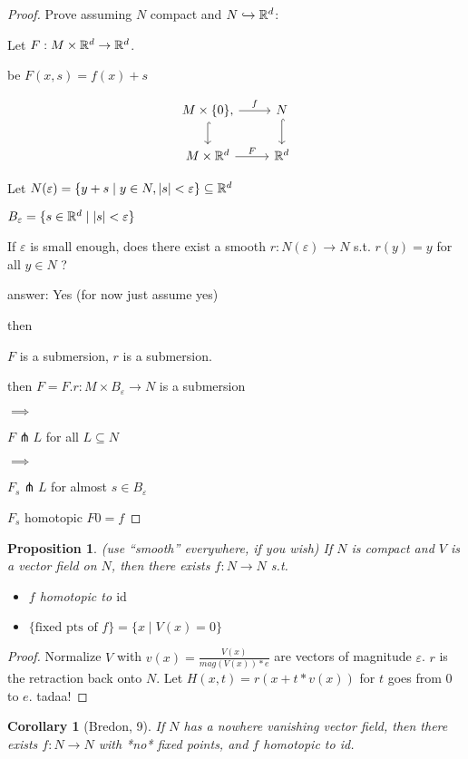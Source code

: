 \documentclass[11pt]{amsbook}
\newenvironment{dateenv}{
	\vspace{1em}
}{
	\vspace{1em}
}
\newcommand{\mydate}[4]{
	\newdate{#1}{#2}{#3}{#4}
	\begin{dateenv}
		\hfill\displaydate{#1}
	\end{dateenv}
}
\theoremstyle{mystyle} \newtheorem{thrm}[thm]{Theorem}
\theoremstyle{mystyle} \newtheorem{defi}[thm]{Definition}
\theoremstyle{mystyle} \newtheorem{coro}[thm]{Corollary}
\theoremstyle{mystyle} \newtheorem{propo}[thm]{Proposition}
\theoremstyle{mystyle} \newtheorem{lemm}[thm]{Lemma}
\numberwithin{thm}{section}
\newcommand{\id}{\text{id}}
\renewcommand{\epsilon}{\varepsilon}
\newcommand{\transverse}{\pitchfork}
\newcommand{\x}{\times}
\begin{document}
\begin{proof}
	Prove assuming $N$ compact and $N \hookrightarrow {\mathbb R}^d$:

	Let $\overset{~}{F}: M \x \R^d \to \R^d$.

	be $\overset{~}{F}(x,s) = f(x) + s$

	$$\begin{tikzcd}
		M \x \{0\} \arrow[r, "f"], \arrow[d, hook] & N \arrow[d, hook] \\
		M \x \R^d \arrow[r, "\overset{~}{F}"] & \R^d
	\end{tikzcd}$$

	Let $N(\epsilon) = \{ y+s \mid y \in N, |s| < \epsilon \} \subseteq \R^d$

	$B_{\epsilon} = \{ s \in \R^d \mid |s| < \epsilon \}$

	If $\epsilon$ is small enough, does there exist a smooth $r : N(\epsilon) \to N$ s.t. $r(y) = y$ for all $y \in N$ ?

	answer: Yes (for now just assume yes)

	then

	$\overset{~}{F}$ is a submersion, $r$ is a submersion.

	then $F = \overset{~}{F}.r : M \x B_\epsilon \to N$ is a submersion

	$\implies$

	$F \transverse L$ for all $L \subseteq N$

	$\implies$

	$F_s \transverse L$ for almost $s \in B_\epsilon$

	$F_s$ homotopic $F0 = f$

\end{proof}
\mydate{d10}{7}{11}{2016}
\begin{propo}
	(use ``smooth'' everywhere, if you wish)
	If $N$ is compact and $V$ is a vector field on $N$, then there exists $f: N \to N$ s.t.
	\begin{itemize}
		\item $f$ homotopic to $\id$
		\item $\{ \text{fixed pts of } f \} = \{ x \mid V(x) = 0 \}$
	\end{itemize}
\end{propo}
\begin{proof}
	Normalize $V$ with $v(x) = \frac{V(x)}{mag(V(x))*e}$ are vectors of magnitude $\epsilon$.
	$r$ is the retraction back onto $N$.
	Let $H(x,t) = r(x + t*v(x))$ for $t$ goes from $0$ to $e$.
	tadaa!
\end{proof}
\begin{coro}[Bredon, 9]
	If $N$ has a nowhere vanishing vector field, then there exists $f: N \to N$ with *no* fixed points, and $f$ homotopic to id.
\end{coro}
\end{document}
